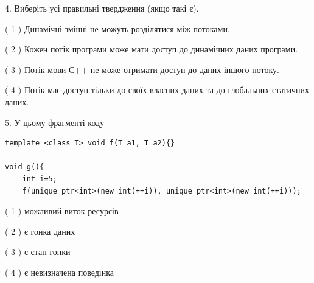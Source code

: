 \documentclass[12pt, ukrainian]{article}
\begin{document}
\begin {large}
{%
4. Виберіть усі правильні твердження (якщо такі є).\par
\vspace{2mm}

( 1 ) Динамічні змінні не можуть розділятися між потоками.%

( 2 ) Кожен потік програми може мати доступ до динамічних даних програми.%

( 3 ) Потік мови С++ не може отримати доступ до даних іншого потоку.%

( 4 ) Потік має доступ тільки до своїх власних даних та до глобальних статичних даних.%


5. У цьому фрагменті коду
\begin{verbatim}
template <class T> void f(T a1, T a2){}

void g(){
    int i=5;
    f(unique_ptr<int>(new int(++i)), unique_ptr<int>(new int(++i)));
\end{verbatim}

( 1 ) можливий виток ресурсів%

( 2 ) є гонка даних%

( 3 ) є стан гонки%

( 4 ) є невизначена поведінка%
}
\end {large}

\newpage
\end{document}
